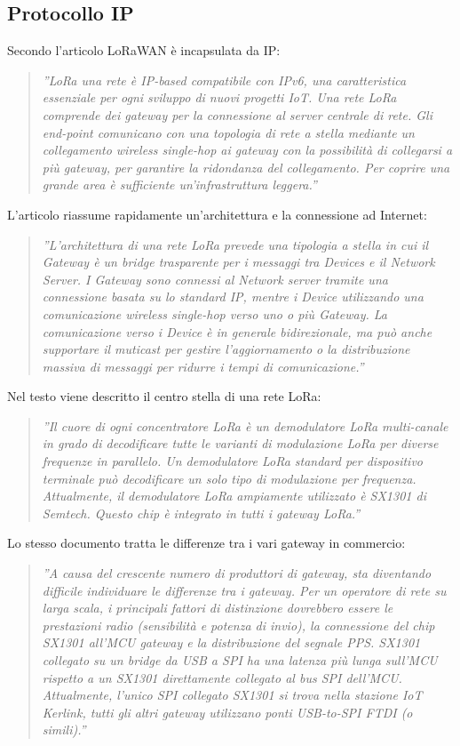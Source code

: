 \documentclass[a4paper]{report} %
\begin{document}
\subsection{Protocollo IP} 
Secondo l'articolo \cite{art:rif.20} LoRaWAN è incapsulata da IP:
\begin{quote}
	\textit{''LoRa una rete è IP-based compatibile con IPv6, una caratteristica essenziale per ogni sviluppo di nuovi progetti IoT. Una rete LoRa comprende dei gateway per la connessione al server centrale di rete. Gli end-point comunicano con una topologia di rete a stella mediante un collegamento wireless single-hop ai gateway con la possibilità di collegarsi a più gateway, per garantire la ridondanza del collegamento. Per coprire una grande area è sufficiente un'infrastruttura leggera.''}
\end{quote}
L'articolo \cite{art:rif.25} riassume rapidamente un'architettura e la connessione ad Internet:
\begin{quote}
	\textit{''L'architettura di una rete LoRa prevede una tipologia a stella in cui il Gateway è un bridge trasparente per i messaggi tra Devices e il Network Server. I Gateway sono connessi al Network server tramite una connessione basata su lo standard IP, mentre i Device utilizzando una comunicazione wireless single-hop verso uno o più Gateway. La comunicazione verso i Device è in generale bidirezionale, ma può anche supportare il muticast per gestire l'aggiornamento o la distribuzione massiva di messaggi per ridurre i tempi di comunicazione.''}
\end{quote}
Nel testo \cite{art:rif.30} viene descritto il centro stella di una rete LoRa:
\begin{quote}
	\textit{''Il cuore di ogni concentratore LoRa è un demodulatore LoRa multi-canale in grado di decodificare tutte le varianti di modulazione LoRa per diverse frequenze in parallelo. Un demodulatore LoRa standard per dispositivo terminale può decodificare un solo tipo di modulazione per frequenza. Attualmente, il demodulatore LoRa ampiamente utilizzato è SX1301 di Semtech. Questo chip è integrato in tutti i gateway LoRa.''}
\end{quote}
Lo stesso documento tratta le differenze tra i vari gateway in commercio:
\begin{quote}
	\textit{''A causa del crescente numero di produttori di gateway, sta diventando difficile individuare le differenze tra i gateway. Per un operatore di rete su larga scala, i principali fattori di distinzione dovrebbero essere le prestazioni radio (sensibilità e potenza di invio), la connessione del chip SX1301 all'MCU gateway e la distribuzione del segnale PPS. SX1301 collegato su un bridge da USB a SPI ha una latenza più lunga sull'MCU rispetto a un SX1301 direttamente collegato al bus SPI dell'MCU. Attualmente, l'unico SPI collegato SX1301 si trova nella stazione IoT Kerlink, tutti gli altri gateway utilizzano ponti USB-to-SPI FTDI (o simili).''}
\end{quote}
\end{document}
